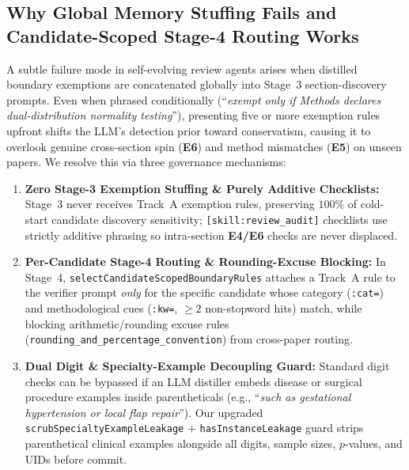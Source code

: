 \documentclass[11pt,a4paper]{article}
\begin{document}
\subsection{Why Global Memory Stuffing Fails and Candidate-Scoped Stage-4 Routing Works}
A subtle failure mode in self-evolving review agents arises when distilled boundary exemptions are concatenated globally into Stage~3 section-discovery prompts. Even when phrased conditionally (``\emph{exempt only if Methods declares dual-distribution normality testing}''), presenting five or more exemption rules upfront shifts the LLM's detection prior toward conservatism, causing it to overlook genuine cross-section spin (\textbf{E6}) and method mismatches (\textbf{E5}) on unseen papers. We resolve this via three governance mechanisms:
\begin{enumerate}[leftmargin=1.5em,itemsep=2pt]
  \item \textbf{Zero Stage-3 Exemption Stuffing \& Purely Additive Checklists:} Stage~3 never receives Track~A exemption rules, preserving $100\%$ of cold-start candidate discovery sensitivity; \texttt{[skill:review\_audit]} checklists use strictly additive phrasing so intra-section \textbf{E4/E6} checks are never displaced.
  \item \textbf{Per-Candidate Stage-4 Routing \& Rounding-Excuse Blocking:} In Stage~4, \texttt{selectCandidateScopedBoundaryRules} attaches a Track~A rule to the verifier prompt \emph{only} for the specific candidate whose category (\texttt{:cat=}) and methodological cues (\texttt{:kw=}, $\ge 2$ non-stopword hits) match, while blocking arithmetic/rounding excuse rules (\texttt{rounding\_\allowbreak and\_\allowbreak percentage\_\allowbreak convention}) from cross-paper routing.
  \item \textbf{Dual Digit \& Specialty-Example Decoupling Guard:} Standard digit checks can be bypassed if an LLM distiller embeds disease or surgical procedure examples inside parentheticals (e.g., ``\emph{such as gestational hypertension or local flap repair}''). Our upgraded \texttt{scrubSpecialtyExampleLeakage} + \texttt{hasInstanceLeakage} guard strips parenthetical clinical examples alongside all digits, sample sizes, $p$-values, and UIDs before commit.
\end{enumerate}
\end{document}

